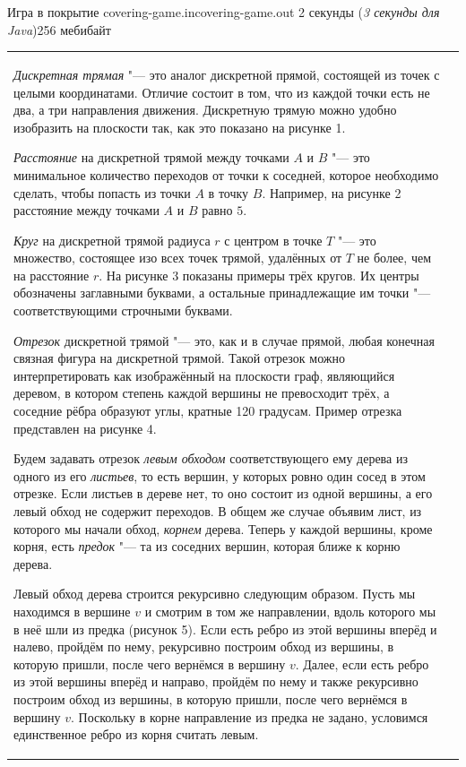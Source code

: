 \gdef\thisproblemauthor{Иван Казменко}
\gdef\thisproblemdeveloper{Иван Казменко}
\begin{problem}{Игра в покрытие}
{covering-game.in}{covering-game.out}
{2 секунды (\textsl{3 секунды для Java})}{256 мебибайт}{}

\begin{tabular}{lr}
\hskip -0.8cm
\begin{minipage}{0.70\thelinewidth}
\parindent=0.6cm
\textit{Дискретная трямая} "--- это аналог дискретной прямой,
состоящей из точек с целыми координатами.
Отличие состоит в том, что из каждой точки есть не два,
а три направления движения.
Дискретную трямую можно удобно изобразить на плоскости так, как это
показано на рисунке 1.

\textit{Расстояние} на дискретной трямой между точками $A$ и $B$ "--- это
минимальное количество переходов от точки к соседней, которое необходимо
сделать, чтобы попасть из точки $A$ в точку $B$.
Например, на рисунке 2 расстояние между точками $A$ и $B$ равно $5$.

\textit{Круг} на дискретной трямой радиуса $r$ с центром
в точке $T$ "--- это множество, состоящее изо всех точек трямой,
удалённых от $T$ не более, чем на расстояние $r$.
На рисунке 3 показаны примеры трёх кругов.
Их центры обозначены заглавными буквами, а остальные принадлежащие им
точки "--- соответствующими строчными буквами.

\textit{Отрезок} дискретной трямой "--- это, как и в случае прямой,
любая конечная связная фигура на дискретной трямой.
Такой отрезок можно интерпретировать как изображённый на плоскости граф,
являющийся деревом, в котором степень каждой вершины не превосходит трёх,
а соседние рёбра образуют углы, кратные 120 градусам.
Пример отрезка представлен на рисунке 4.

Будем задавать отрезок \textit{левым обходом} соответствующего ему дерева
из одного из его \textit{листьев}, то есть вершин, у которых ровно один сосед
в этом отрезке.
Если листьев в дереве нет, то оно состоит из одной вершины,
а его левый обход не содержит переходов.
В общем же случае объявим лист, из которого мы начали обход,
\textit{корнем} дерева.
Теперь у каждой вершины, кроме корня, есть \textit{предок} "--- та
из соседних вершин, которая ближе к корню дерева.

Левый обход дерева строится рекурсивно следующим образом.
Пусть мы находимся в вершине $v$ и смотрим в том же направлении,
вдоль которого мы в неё шли из предка (рисунок 5).
Если есть ребро из этой вершины вперёд и налево, пройдём по нему,
рекурсивно построим обход из вершины, в которую пришли,
после чего вернёмся в вершину $v$.
Далее, если есть ребро из этой вершины вперёд и направо, пройдём по нему
и также рекурсивно построим обход из вершины, в которую пришли,
после чего вернёмся в вершину $v$.
Поскольку в корне направление из предка не задано, условимся единственное
ребро из корня считать левым.


\end{minipage}
\end{tabular}
\end{problem}
